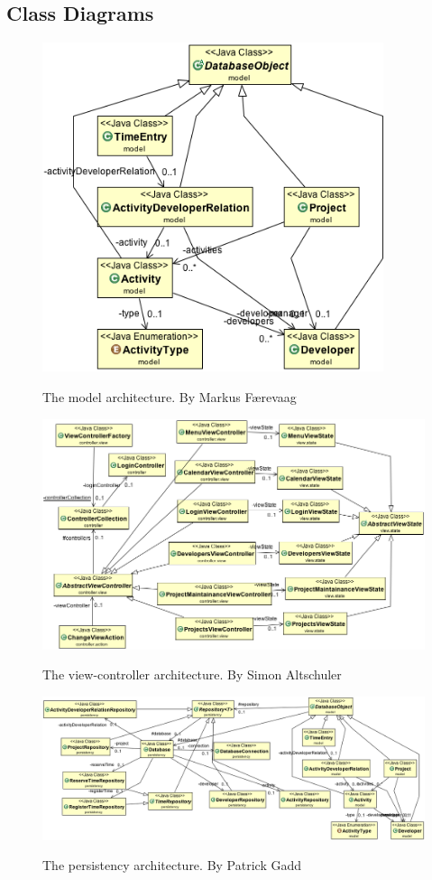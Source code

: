 \documentclass[danish]{article}
\begin{document}
\subsection{Class Diagrams}
\begin{figure}[H]
  \centering
  \includegraphics[width=10cm]{uml/model-simple-uml.png}
  \label{fig:model_uml}
  \caption{The model architecture. By Markus Færevaag}
\end{figure}

\begin{figure}[H]
  \centering
  \includegraphics[width=15cm]{uml/controller-simple-uml.png}
  \label{fig:vc_uml}
  \caption{The view-controller architecture. By Simon Altschuler}
\end{figure}


\begin{figure}[H]
  \centering
  \includegraphics[width=15cm]{uml/model-persistency-simple-uml.png}
  \label{fig:persistency_uml}
  \caption{The persistency architecture. By Patrick Gadd}
\end{figure}
\end{document}
